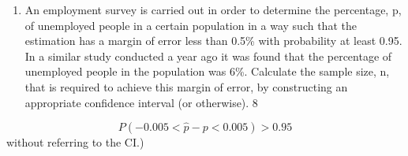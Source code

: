 \documentclass[a4paper,12pt]{article}
\begin{document}
\begin{enumerate}
\item An employment survey is carried out in order to determine the percentage, p, of
unemployed people in a certain population in a way such that the estimation has a margin of error less than 0.5\% with probability at least 0.95. In a similar study conducted a year ago it was found that the percentage of unemployed people in the
population was 6\%. Calculate the sample size, n, that is required to achieve this margin of error, by
constructing an appropriate confidence interval (or otherwise).
8



\end{enumerate}
\newpage

\[P ( - 0.005 < \hat{p} - p < 0.005 ) > 0.95 \]without referring to the CI.)



\end{document}
